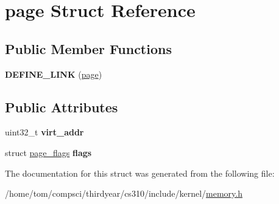 \hypertarget{structpage}{}\section{page Struct Reference}
\label{structpage}
\subsection*{Public Member Functions}
\begin{DoxyCompactItemize}
\item 
\mbox{\label{structpage_ae11253c57740ec512b3787d41e00dae3}} 
{\bfseries D\+E\+F\+I\+N\+E\+\_\+\+L\+I\+NK} (\mbox{\hyperlink{structpage}{page}})
\end{DoxyCompactItemize}
\subsection*{Public Attributes}
\begin{DoxyCompactItemize}
\item 
\mbox{\label{structpage_afe904188722e82c88efbc063b01163db}} 
uint32\+\_\+t {\bfseries virt\+\_\+addr}
\item 
\mbox{\label{structpage_a76f99b933102f9ca9df4823337a37ceb}} 
struct \mbox{\hyperlink{structpage__flags}{page\+\_\+flags}} {\bfseries flags}
\end{DoxyCompactItemize}


The documentation for this struct was generated from the following file\+:\begin{DoxyCompactItemize}
\item 
/home/tom/compsci/thirdyear/cs310/include/kernel/\mbox{\hyperlink{memory_8h}{memory.\+h}}\end{DoxyCompactItemize}
